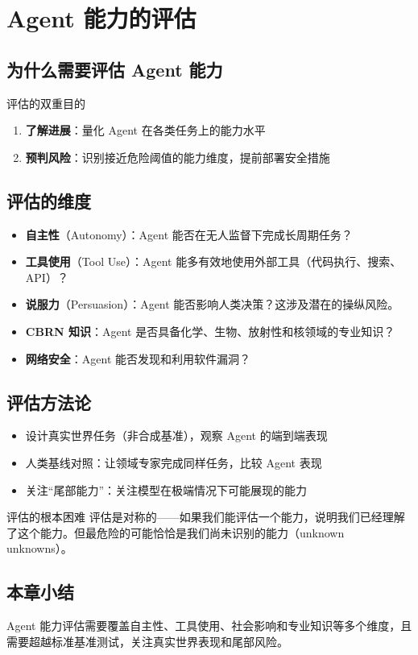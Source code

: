 \section{Agent 能力的评估}

\subsection{为什么需要评估 Agent 能力}

\begin{importantbox}{评估的双重目的}
\begin{enumerate}
    \item \textbf{了解进展}：量化 Agent 在各类任务上的能力水平
    \item \textbf{预判风险}：识别接近危险阈值的能力维度，提前部署安全措施
\end{enumerate}
\end{importantbox}

\subsection{评估的维度}

\begin{itemize}
    \item \textbf{自主性}（Autonomy）：Agent 能否在无人监督下完成长周期任务？
    \item \textbf{工具使用}（Tool Use）：Agent 能多有效地使用外部工具（代码执行、搜索、API）？
    \item \textbf{说服力}（Persuasion）：Agent 能否影响人类决策？这涉及潜在的操纵风险。
    \item \textbf{CBRN 知识}：Agent 是否具备化学、生物、放射性和核领域的专业知识？
    \item \textbf{网络安全}：Agent 能否发现和利用软件漏洞？
\end{itemize}

\subsection{评估方法论}

\begin{itemize}
    \item 设计真实世界任务（非合成基准），观察 Agent 的端到端表现
    \item 人类基线对照：让领域专家完成同样任务，比较 Agent 表现
    \item 关注``尾部能力''：关注模型在极端情况下可能展现的能力
\end{itemize}

\begin{warningbox}{评估的根本困难}
评估是对称的——如果我们能评估一个能力，说明我们已经理解了这个能力。但最危险的可能恰恰是我们尚未识别的能力（unknown unknowns）。
\end{warningbox}

\subsection{本章小结}

Agent 能力评估需要覆盖自主性、工具使用、社会影响和专业知识等多个维度，且需要超越标准基准测试，关注真实世界表现和尾部风险。


